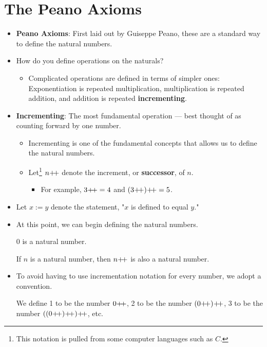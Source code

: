 \documentclass[../main.tex]{subfiles}
\begin{document}
\section{The Peano Axioms}
\begin{itemize}
    \item \textbf{Peano Axioms}: First laid out by Guiseppe Peano, these are a standard way to define the natural numbers.
    \item How do you define operations on the naturals?
    \begin{itemize}
        \item Complicated operations are defined in terms of simpler ones: Exponentiation is repeated multiplication, multiplication is repeated addition, and addition is repeated \textbf{incrementing}.
    \end{itemize}
    \item \textbf{Incrementing}: The most fundamental operation --- best thought of as counting forward by one number.
    \begin{itemize}
        \item Incrementing is one of the fundamental concepts that allows us to define the natural numbers.
        \item Let\footnote{This notation is pulled from some computer languages such as $C$.} $n\hspace{-0.7mm}+\hspace{-1.5mm}+$ denote the increment, or \textbf{successor}, of $n$.
        \begin{itemize}
            \item For example, $3\hspace{-0.7mm}+\hspace{-1.5mm}+=4$ and $(3\hspace{-0.7mm}+\hspace{-1.5mm}+)\hspace{-0.7mm}+\hspace{-1.5mm}+=5$.
        \end{itemize}
    \end{itemize}
    \item Let $x:=y$ denote the statement, "$x$ is defined to equal $y$."
    \item At this point, we can begin defining the natural numbers.
    \begin{axm}\label{axm:0inN}
        0 is a natural number.
    \end{axm}
    \begin{axm}\label{axm:npplus}
        If $n$ is a natural number, then $n\hspace{-0.7mm}+\hspace{-1.5mm}+$ is also a natural number.
    \end{axm}
    \item To avoid having to use incrementation notation for every number, we adopt a convention.
    \begin{defn}
        We define 1 to be the number $0\hspace{-0.7mm}+\hspace{-1.5mm}+$, 2 to be the number $(0\hspace{-0.7mm}+\hspace{-1.5mm}+)\hspace{-0.7mm}+\hspace{-1.5mm}+$, 3 to be the number $((0\hspace{-0.7mm}+\hspace{-1.5mm}+)\hspace{-0.7mm}+\hspace{-1.5mm}+)\hspace{-0.7mm}+\hspace{-1.5mm}+$, etc.

\end{defn}
\end{itemize}
\end{document}
